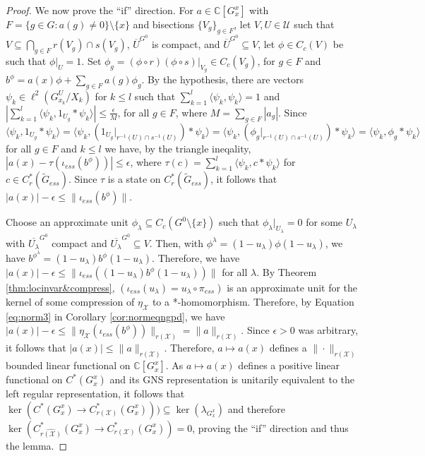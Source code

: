 \documentclass[10pt,a4paper]{amsart}
\begin{document}
\begin{proof}
We now prove the ``if'' direction. For $a\in \mathbb{C}[G^{x}_{x}]$ with $F = \{g\in G:a(g)\neq 0\}\setminus \{x\}$ and bisections $\{V_{g}\}_{g\in F}$, let $V,U\in\mathcal{U}$ such that $V\subseteq \bigcap_{g\in F}r(V_{g})\cap s(V_{g})$, $\overline{U}^{G^{0}}$ is compact, and $\overline{U}^{G^{0}}\subseteq V$, let $\phi\in C_{c}(V)$ be such that $\phi|_{U} = 1$. Set $\phi_{g} = (\phi\circ r)(\phi\circ s)|_{V_{g}}\in C_{c}(V_{g})$, for $g\in F$ and $b^{\phi} = a(x)\phi + \sum_{g\in F}a(g)\phi_{g}$. By the hypothesis, there are vectors $\psi_{k}\in \ell^{2}(G^{U}_{x_{k}}/X_{k})$ for $k\leq l$ such that $\sum^{l}_{k=1} \langle\psi_{k}, \psi_{k}\rangle = 1$ and $|\sum^{l}_{k=1}\langle \psi_{k}, 1_{U_{g}}*\psi_{k}\rangle| \leq \frac{\epsilon}{M}$, for all $g\in F$, where $M = \sum_{g\in F} |a_{g}|$. Since $\langle \psi_{k}, 1_{U_{g}}*\psi_{k}\rangle = \langle \psi_{k}, (1_{U_{g}}|_{r^{-1}(U)\cap s^{-1}(U)})*\psi_{k}\rangle = \langle \psi_{k}, (\phi_{g}|_{r^{-1}(U)\cap s^{-1}(U)})*\psi_{k}\rangle = \langle \psi_{k}, \phi_{g}*\psi_{k}\rangle$ for all $g\in F$ and $k\leq l$ we have, by the triangle ineqality, $|a(x) - \tau(\iota_{ess}(b^{\phi}))|\leq \epsilon$, where $\tau(c) = \sum^{l}_{k=1}\langle \psi_{k}, c*\psi_{k}\rangle$ for $c\in C^{*}_{r}(\tilde{G}_{ess})$. Since $\tau$ is a state on $C^{*}_{r}(\tilde{G}_{ess})$, it follows that $|a(x)| - \epsilon \leq \|\iota_{ess}(b^{\phi})\|$. 

Choose an approximate unit $\phi_{\lambda}\subseteq C_{c}(G^{0}\setminus \{x\})$ such that $\phi_{\lambda}|_{U_{\lambda}} = 0$ for some $U_{\lambda}$ with $\overline{U_{\lambda}}^{G^{0}}$ compact and $\overline{U_{\lambda}}^{G^{0}}\subseteq V$. Then, with $\phi^{\lambda} = (1-u_{\lambda})\phi(1-u_{\lambda})$, we have $b^{\phi^{\lambda}} = (1-u_{\lambda})b^{\phi}(1-u_{\lambda})$. Therefore, we have $|a(x)| - \epsilon \leq \|\iota_{ess}((1-u_{\lambda})b^{\phi}(1-u_{\lambda}))\|$ for all $\lambda$. By Theorem \ref{thm:locinvar&compress}, $(\iota_{ess}(u_{\lambda}) = u_{\lambda}\circ \pi_{ess})$ is an approximate unit for the kernel of some compression of $\eta_{\mathcal{X}}$ to a *-homomorphism. Therefore, by Equation \ref{eq:norm3} in Corollary \ref{cor:normeqngpd}, we have $|a(x)| - \epsilon \leq \|\eta_{\mathcal{X}}(\iota_{ess}(b^{\phi}))\|_{r(\mathcal{X})} = \|a\|_{r(\mathcal{X})}$. Since $\epsilon > 0$ was arbitrary, it follows that $|a(x)|\leq \|a\|_{r(\mathcal{X})}$. Therefore, $a\mapsto a(x)$ defines a $\|\cdot\|_{r(\mathcal{X})}$ bounded linear functional on $\mathbb{C}[G^{x}_{x}]$. As $a\mapsto a(x)$ defines a positive linear functional on $C^{*}(G^{x}_{x})$ and its GNS representation is unitarily equivalent to the left regular representation, it follows that $\ker(C^{*}(G_{x}^{x})\to C_{r(\mathcal{X})}^{*}(G^{x}_{x})))\subseteq \ker(\lambda_{G^{x}_{x}})$ and therefore $\ker(C^{*}_{\widehat{r(\mathcal{X})}}(G^{x}_{x})\to C^{*}_{r(\mathcal{X})}(G^{x}_{x})) = 0$, proving the ``if'' direction and thus the lemma. 
\end{proof}
\end{document}
